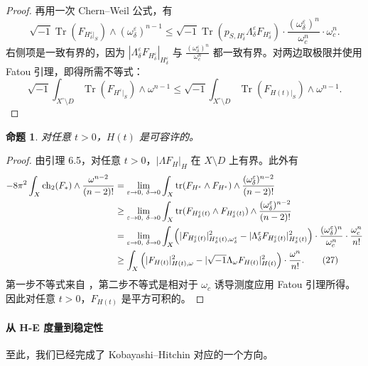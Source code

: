 \documentclass[12pt,a4paper]{article}
\newtheorem{proposition}[theorem]{命题}
\newcommand{\ch}{\operatorname{ch}}
\newcommand{\Tr}{\operatorname{Tr}}
\begin{document}
\begin{proof}
再用一次 Chern--Weil 公式，有
\[
\sqrt{-1}\Tr(F_{H^\varepsilon_\delta|_S})\wedge (\omega^\varepsilon_\delta)^{n-1}
\le
\sqrt{-1}\Tr(p_{S,H^\varepsilon_\delta}\Lambda^\varepsilon_\delta F_{H^\varepsilon_\delta})
\cdot
\frac{(\omega^\varepsilon_\delta)^n}{\omega_c^n}\cdot \omega_c^n.
\]
右侧项是一致有界的，因为 \(|\Lambda^\varepsilon_\delta F_{H^\varepsilon_\delta}|_{H^\varepsilon_\delta}\) 与 \(\frac{(\omega^\varepsilon_\delta)^n}{\omega_c^n}\) 都一致有界。对两边取极限并使用 Fatou 引理，即得所需不等式：
\[
\sqrt{-1}\int_{X^\circ\setminus D}\Tr(F_{H^\varepsilon|_S})\wedge \omega^{n-1}
\le
\sqrt{-1}\int_{X^\circ\setminus D}\Tr(F_{H(t)|_S})\wedge \omega^{n-1}.
\]
\end{proof}

\begin{proposition}
对任意 \(t>0\)，\(H(t)\) 是可容许的。
\end{proposition}

\begin{proof}
由引理 6.5，对任意 \(t>0\)，\(|\Lambda F_H|_H\) 在 \(X\setminus D\) 上有界。此外有
\begin{align}
-8\pi^2
\int_X \ch_2(F_*)\wedge \frac{\omega^{n-2}}{(n-2)!}
&=
\lim_{\varepsilon\to 0,\ \delta\to 0}
\int_X
\operatorname{tr}(F_{H^\varepsilon}\wedge F_{H^\varepsilon})\wedge \frac{(\omega^\varepsilon_\delta)^{n-2}}{(n-2)!}
\nonumber\\
&\ge
\lim_{\varepsilon\to 0,\ \delta\to 0}
\int_X
\operatorname{tr}(F_{H^\varepsilon_\delta(t)}\wedge F_{H^\varepsilon_\delta(t)})\wedge
\frac{(\omega^\varepsilon_\delta)^{n-2}}{(n-2)!}
\nonumber\\
&=
\lim_{\varepsilon\to 0,\ \delta\to 0}
\int_X
\Bigl(
|F_{H^\varepsilon_\delta(t)}|^2_{H^\varepsilon_\delta(t),\omega^\varepsilon_\delta}
-
|\Lambda^\varepsilon_\delta F_{H^\varepsilon_\delta(t)}|^2_{H^\varepsilon_\delta(t)}
\Bigr)
\cdot
\frac{(\omega^\varepsilon_\delta)^n}{\omega_c^n}
\cdot
\frac{\omega_c^n}{n!}
\nonumber\\
&\ge
\int_X
\left(
|F_{H(t)}|^2_{H(t),\omega}
-
|\sqrt{-1}\Lambda_\omega F_{H(t)}|^2_{H(t)}
\right)\cdot \frac{\omega^n}{n!}. \tag{27}
\end{align}
第一步不等式来自 \cite[Lemma 7.1]{Li2000}，第二步不等式是相对于 \(\omega_c\) 诱导测度应用 Fatou 引理所得。因此对任意 \(t>0\)，\(F_{H(t)}\) 是平方可积的。
\end{proof}

\paragraph{从 H-E 度量到稳定性}
至此，我们已经完成了 Kobayashi--Hitchin 对应的一个方向。
\end{document}
